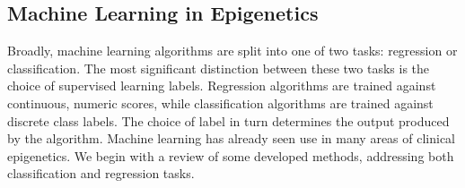 \documentclass{article}
\begin{document}


\subsection{Machine Learning in Epigenetics}
Broadly, machine learning algorithms are split into one of two tasks: regression or classification. The most significant distinction between these two tasks is the choice of supervised learning labels. Regression algorithms are trained against continuous, numeric scores, while classification algorithms are trained against discrete class labels. The choice of label in turn determines the output produced by the algorithm.
Machine learning has already seen use in many areas of clinical epigenetics. We begin with a review of some developed methods, addressing both classification and regression tasks.
\end{document}
